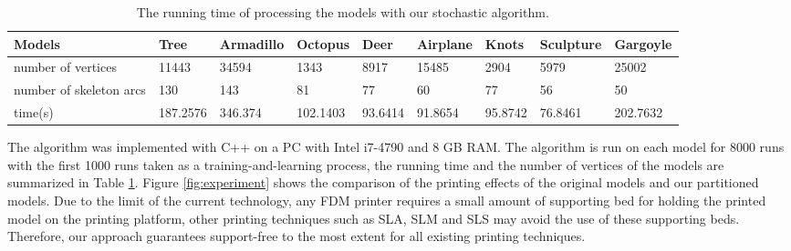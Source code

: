 \begin{table}[htb]

\begin{footnotesize}

\begin{center}

    \begin{tabular}{p{3.0cm} p{1.45cm} p{1.3cm} p{1.3cm} p{1.3cm} p{1.35cm} p{1.5cm} p{1.5cm}p{1.5cm}}

    \hline

     Models& Tree& Armadillo& Octopus& Deer& Airplane& Knots &Sculpture & Gargoyle\\ \hline
     number of vertices & 11443   & 34594   & 1343    & 8917  & 15485 & 2904    & 5979    &25002 \\ \hline
     number of skeleton arcs    &130 & 143 & 81 &77 &60 & 77 &56  &50 \\ \hline
     time(s)    &187.2576 & 346.374 & 102.1403 &93.6414 &91.8654 & 95.8742 &76.8461  &202.7632 \\
  \hline

    \end{tabular}

\end{center}

\end{footnotesize}

\caption{The running time of processing the models with our stochastic algorithm.}\label{tab:ertms:time}

\end{table}






The algorithm was implemented with C++ on a PC with Intel i7-4790 and 8 GB RAM. The algorithm is run on each model for 8000 runs with the first 1000 runs taken as a training-and-learning process, the running time and the number of vertices of the models are summarized in Table \ref{tab:ertms:time}. Figure \ref{fig:experiment} shows the comparison of the printing effects of the original models and our partitioned models. Due to the limit of the current technology, any FDM printer requires a small amount of supporting bed for holding the printed model on the printing platform, other printing techniques such as SLA, SLM and SLS may avoid the use of these supporting beds. Therefore, our approach guarantees support-free to the most extent for all existing printing techniques.

